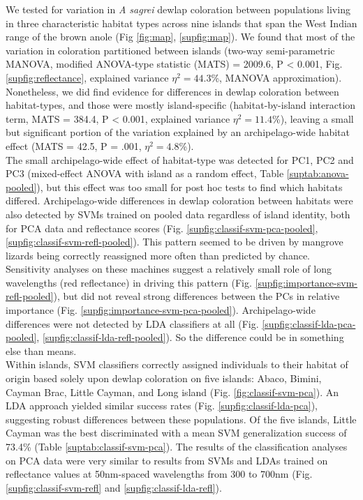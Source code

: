 
We tested for variation in \textit{A sagrei} dewlap coloration between populations living in three characteristic habitat types across nine islands that span the West Indian range of the brown anole (Fig \ref{fig:map}, \ref{supfig:map}). We found that most of the variation in coloration partitioned between islands (two-way semi-parametric MANOVA, modified ANOVA-type statistic (MATS) = 2009.6, P < 0.001, Fig. \ref{supfig:reflectance}, explained variance $\eta^2 = 44.3$\%, MANOVA approximation). Nonetheless, we did find evidence for differences in dewlap coloration between habitat-types, and those were mostly island-specific (habitat-by-island interaction term, MATS = 384.4, P < 0.001, explained variance $\eta^2 = 11.4$\%), leaving a small but significant portion of the variation explained by an archipelago-wide habitat effect (MATS = 42.5, P = .001, $\eta^2 = 4.8$\%).\\

The small archipelago-wide effect of habitat-type was detected for PC1, PC2 and PC3 (mixed-effect ANOVA with island as a random effect, Table \ref{suptab:anova-pooled}), but this effect was too small for post hoc tests to find which habitats differed. Archipelago-wide differences in dewlap coloration between habitats were also detected by SVMs trained on pooled data regardless of island identity, both for PCA data and reflectance scores (Fig. \ref{supfig:classif-svm-pca-pooled}, \ref{supfig:classif-svm-refl-pooled}). This pattern seemed to be driven by mangrove lizards being correctly reassigned more often than predicted by chance. Sensitivity analyses on these machines suggest a relatively small role of long wavelengths (red reflectance) in driving this pattern (Fig. \ref{supfig:importance-svm-refl-pooled}), but did not reveal strong differences between the PCs in relative importance (Fig. \ref{supfig:importance-svm-pca-pooled}).  Archipelago-wide differences were not detected by LDA classifiers at all (Fig. \ref{supfig:classif-lda-pca-pooled}, \ref{supfig:classif-lda-refl-pooled}). So the difference could be in something else than means.\\

Within islands, SVM classifiers correctly assigned individuals to their habitat of origin based solely upon dewlap coloration on five islands: Abaco, Bimini, Cayman Brac, Little Cayman, and Long island (Fig. \ref{fig:classif-svm-pca}). An LDA approach yielded similar success rates (Fig. \ref{supfig:classif-lda-pca}), suggesting robust differences between these populations. Of the five islands, Little Cayman was the best discriminated with a mean SVM generalization success of 73.4\% (Table \ref{suptab:classif-svm-pca}). The results of the classification analyses on PCA data were very similar to results from SVMs and LDAs trained on reflectance values at 50nm-spaced wavelengths from 300 to 700nm (Fig. \ref{supfig:classif-svm-refl} and \ref{supfig:classif-lda-refl}).\\


